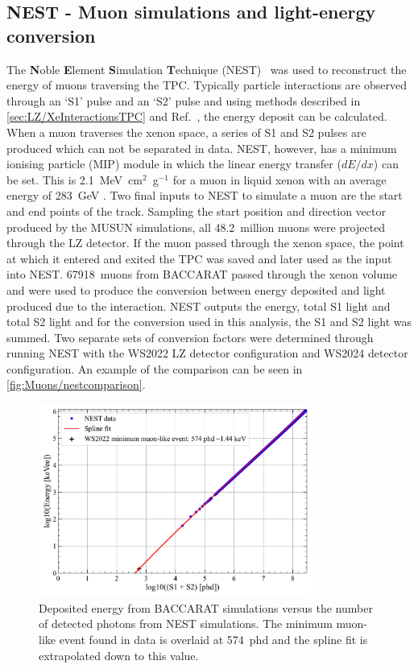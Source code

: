 \subsection{NEST - Muon simulations and light-energy conversion}\label{sec:Muons/MuonFluxNEST}
The \textbf{N}oble \textbf{E}lement \textbf{S}imulation \textbf{T}echnique (NEST)~\cite{NEST2011} was used to reconstruct the energy of muons traversing the TPC. Typically particle interactions are observed through an `S1' pulse and an `S2' pulse and using methods described in \autoref{sec:LZ/XeInteractionsTPC} and Ref.~\cite{NEST2011}, the energy deposit can be calculated. When a muon traverses the xenon space, a series of S1 and S2 pulses are produced which can not be separated in data. NEST, however, has a minimum ionising particle (MIP) module in which the linear energy transfer ($dE/dx$) can be set. This is 2.1~MeV~cm$^2$~g$^{-1}$ for a muon in liquid xenon with an average energy of 283~GeV \cite{MUE}. Two final inputs to NEST to simulate a muon are the start and end points of the track.
Sampling the start position and direction vector produced by the MUSUN simulations, all 48.2~million muons were projected through the LZ detector. If the muon passed through the xenon space, the point at which it entered and exited the TPC was saved and later used as the input into NEST. 67918~muons from BACCARAT passed through the xenon volume and were used to produce the conversion between energy deposited and light produced due to the interaction. NEST outputs the energy, total S1 light and total S2 light and for the conversion used in this analysis, the S1 and S2 light was summed.
Two separate sets of conversion factors were determined through running NEST with the WS2022 LZ detector configuration and WS2024 detector configuration. An example of the comparison can be seen in \autoref{fig:Muons/nestcomparison}.
\begin{figure}[ht!]
    \centering
    \includegraphics[width=0.8\textwidth]{figures/Muons/TPCEnergyConversion.pdf}
    \caption{Deposited energy from BACCARAT simulations versus the number of detected photons from NEST simulations. The minimum muon-like event found in data is overlaid at 574~phd and the spline fit is extrapolated down to this value.}
    \label{fig:Muons/nestcomparison}
\end{figure}

